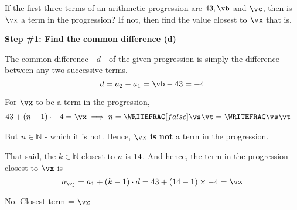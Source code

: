 



\ADD\va\vd\vb
\ADD\vb\vd\vc
\EXPR[0]
\ADD{}\vx

\SUBTRACT\vx\va\vp
\FRACDIV{}\vq\vr
\FRACADD\vq{}\vs\vt

\question[4] If the first three terms of an arithmetic progression are $\va,\vb$ and $\vc$, then 
is $\vx$ a term in the progression? If not, then find the value closest to $\vx$ that is.

\watchout

\begin{solution}[\halfpage]
  \textbf{Step \#1: Find the common difference (d)}

  The common difference - $d$ - of the given progression is simply the difference 
  between any two successive terms. 
  \[ d = a_2 - a_1 = \vb - \va = \vd \] 

  For $\vx$ to be a term in the progression,
  \begin{align}
    \va + (n-1)\cdot\vd &= \vx \implies n = \WRITEFRAC[false]\vs\vt = \WRITEFRAC\vs\vt
  \end{align}

  But $n\in\mathbb{N}$ - which it is not. Hence, $\vx$\textbf{ is not} a term in the progression. 

  That said, the $k\in\mathbb{N}$ closest to $n$ is $14$. And hence, 
  the term in the progression closest to $\vx$ is 
  \[ a_{\vj} = a_1 + (k - 1)\cdot d = \va + (\vn - 1)\times\vd = \vz \]
\end{solution}

\ifprintanswers\begin{codex}No. Closest term = $\vz$\end{codex}\fi

